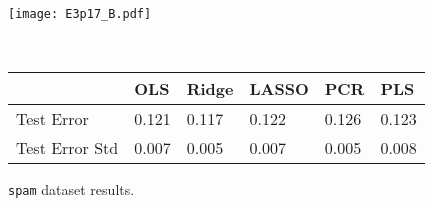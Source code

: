 \begin{figure}
    \begin{minipage}{\textwidth}
        \texttt{[image: E3p17\_B.pdf]}
    \end{minipage}\vspace{1cm}\\
    
    \begin{minipage}{\textwidth}
        \centering
        \begin{tabular}{llllll}
            \toprule
            {} &    OLS &  Ridge &  LASSO &    PCR &    PLS \\
            \midrule
            Test Error     &  0.121 &  0.117 &  0.122 &  0.126 &  0.123 \\
            Test Error Std &  0.007 &  0.005 &  0.007 &  0.005 &  0.008 \\
            \bottomrule
        \end{tabular}
    \end{minipage}
    \caption{\texttt{spam} dataset results.}
\end{figure}


